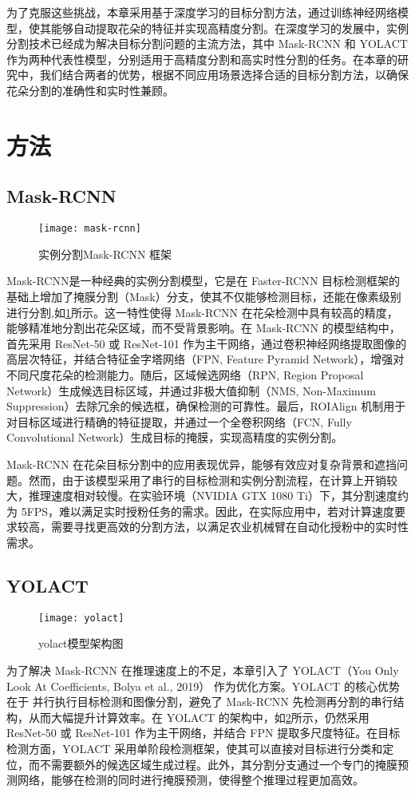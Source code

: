 为了克服这些挑战，本章采用基于深度学习的目标分割方法，通过训练神经网络模型，使其能够自动提取花朵的特征并实现高精度分割。在深度学习的发展中，实例分割技术已经成为解决目标分割问题的主流方法，其中 Mask-RCNN 和 YOLACT 作为两种代表性模型，分别适用于高精度分割和高实时性分割的任务。在本章的研究中，我们结合两者的优势，根据不同应用场景选择合适的目标分割方法，以确保花朵分割的准确性和实时性兼顾。

\section{方法}
\subsection{Mask-RCNN}
 \begin{figure}[htb]
	\texttt{[image: mask-rcnn]}
	\caption[实例分割Mask-RCNN 框架]{实例分割Mask-RCNN 框架} %
	\label{fig:mask-rcnn}
\end{figure}
Mask-RCNN是一种经典的实例分割模型，它是在 Faster-RCNN 目标检测框架的基础上增加了掩膜分割（Mask）分支，使其不仅能够检测目标，还能在像素级别进行分割,如\cref{fig:mask-rcnn}所示。这一特性使得 Mask-RCNN 在花朵检测中具有较高的精度，能够精准地分割出花朵区域，而不受背景影响。在 Mask-RCNN 的模型结构中，首先采用 ResNet-50 或 ResNet-101 作为主干网络，通过卷积神经网络提取图像的高层次特征，并结合特征金字塔网络（FPN, Feature Pyramid Network），增强对不同尺度花朵的检测能力。随后，区域候选网络（RPN, Region Proposal Network）生成候选目标区域，并通过非极大值抑制（NMS, Non-Maximum Suppression）去除冗余的候选框，确保检测的可靠性。最后，ROIAlign 机制用于对目标区域进行精确的特征提取，并通过一个全卷积网络（FCN, Fully Convolutional Network）生成目标的掩膜，实现高精度的实例分割。

Mask-RCNN 在花朵目标分割中的应用表现优异，能够有效应对复杂背景和遮挡问题。然而，由于该模型采用了串行的目标检测和实例分割流程，在计算上开销较大，推理速度相对较慢。在实验环境（NVIDIA GTX 1080 Ti）下，其分割速度约为 5FPS，难以满足实时授粉任务的需求。因此，在实际应用中，若对计算速度要求较高，需要寻找更高效的分割方法，以满足农业机械臂在自动化授粉中的实时性需求。

\subsection{YOLACT}
 \begin{figure}[htb]
	\texttt{[image: yolact]}
	\caption[yolact模型架构图]{yolact模型架构图} %
	\label{fig:yolact}
\end{figure}
为了解决 Mask-RCNN 在推理速度上的不足，本章引入了 YOLACT（You Only Look At Coefficients, Bolya et al., 2019） 作为优化方案。YOLACT 的核心优势在于 并行执行目标检测和图像分割，避免了 Mask-RCNN 先检测再分割的串行结构，从而大幅提升计算效率。在 YOLACT 的架构中，如\cref{fig:yolact}所示，仍然采用 ResNet-50 或 ResNet-101 作为主干网络，并结合 FPN 提取多尺度特征。在目标检测方面，YOLACT 采用单阶段检测框架，使其可以直接对目标进行分类和定位，而不需要额外的候选区域生成过程。此外，其分割分支通过一个专门的掩膜预测网络，能够在检测的同时进行掩膜预测，使得整个推理过程更加高效。

